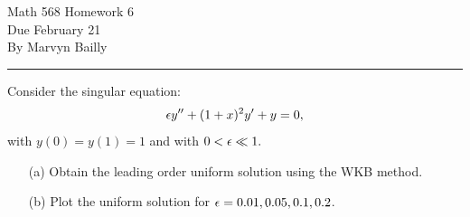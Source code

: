 \documentclass[12pt]{report}
\begin{document}
\large

\begin{center}
 Math 568 Homework 6\\
 Due February 21\\
 By Marvyn Bailly\\
\end{center}

\normalsize

\hrule



\begin{problem}
    Consider the singular equation:
    \[ 
        {\epsilon} y'' + (1+x)^2y' + y = 0,
    \]
    with $y(0) = y(1) = 1$ and with $0< {\epsilon} \ll 1.$
    \begin{enumerate}
        \item [(a)] Obtain the leading order uniform solution using the WKB method. 
        \item [(b)] Plot the uniform solution for ${\epsilon} = 0.01, 0.05, 0.1, 0.2$. 
    \end{enumerate}

\end{problem}
\end{document}
